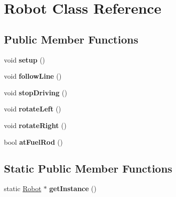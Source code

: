 \hypertarget{classRobot}{\section{Robot Class Reference}
\label{classRobot}
}
\subsection*{Public Member Functions}
\begin{DoxyCompactItemize}
\item 
\hypertarget{classRobot_a1fc37e3c329d59795f6adf44199d4df9}{void {\bfseries setup} ()}\label{classRobot_a1fc37e3c329d59795f6adf44199d4df9}

\item 
\hypertarget{classRobot_a6e3caf6e0346f6a54557eb57a79fc4f4}{void {\bfseries follow\-Line} ()}\label{classRobot_a6e3caf6e0346f6a54557eb57a79fc4f4}

\item 
\hypertarget{classRobot_a959f64b4829ade78bb332f205b50ee70}{void {\bfseries stop\-Driving} ()}\label{classRobot_a959f64b4829ade78bb332f205b50ee70}

\item 
\hypertarget{classRobot_a82a61a1f5fb4a17fd2277329bc6e8fe4}{void {\bfseries rotate\-Left} ()}\label{classRobot_a82a61a1f5fb4a17fd2277329bc6e8fe4}

\item 
\hypertarget{classRobot_a33e931c5ce2e2ce940c96203f1b6d057}{void {\bfseries rotate\-Right} ()}\label{classRobot_a33e931c5ce2e2ce940c96203f1b6d057}

\item 
\hypertarget{classRobot_a536f4b816eae1ee6f10107b5946f341c}{bool {\bfseries at\-Fuel\-Rod} ()}\label{classRobot_a536f4b816eae1ee6f10107b5946f341c}

\end{DoxyCompactItemize}
\subsection*{Static Public Member Functions}
\begin{DoxyCompactItemize}
\item 
\hypertarget{classRobot_ac6f19dc31b435f8a2d43944ba49286d0}{static \hyperlink{classRobot}{Robot} $\ast$ {\bfseries get\-Instance} ()}\label{classRobot_ac6f19dc31b435f8a2d43944ba49286d0}

\end{DoxyCompactItemize}
